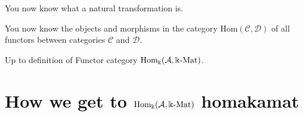 \documentclass[12pt,compress]{beamer}
\newcommand{\HomAkmat}{\mathrm{Hom}_{\Bbbk}(\mathcal{A},\Bbbk\textnormal{-}\mathrm{Mat})}
\begin{document}
\begin{frame}
\begin{centering}
You now know what a natural transformation is.
\end{centering}
\end{frame}

\begin{frame}
\begin{centering}
You now know the objects and morphisms in the category $\mathrm{Hom}(\mathcal{C},\mathcal{D})$ of all functors between categories $\mathcal{C}$ and $\mathcal{D}$.
\end{centering}
\end{frame}


\begin{frame}

\end{frame}



\begin{frame}
Up to definition of Functor category $\HomAkmat$.
\end{frame}

\section{How we get to $\mathrm{Hom}_{\Bbbk}(\mathcal{A},\Bbbk\textnormal{-}\mathrm{Mat})$ homakamat} %
\end{document}
